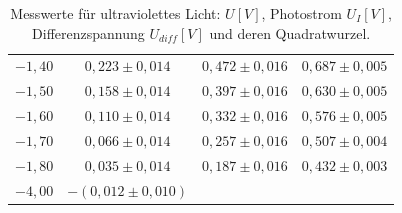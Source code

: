 \begin{table}[h!]
\begin{tabular}{c | ccc}
    $-1,40$ & $0,223 \pm 0,014$ & $0,472 \pm 0,016$ & $0,687 \pm 0,005$ \\
    $-1,50$ & $0,158 \pm 0,014$ & $0,397 \pm 0,016$ & $0,630 \pm 0,005$ \\
    $-1,60$ & $0,110 \pm 0,014$ & $0,332 \pm 0,016$ & $0,576 \pm 0,005$ \\
    $-1,70$ & $0,066 \pm 0,014$ & $0,257 \pm 0,016$ & $0,507 \pm 0,004$ \\
    $-1,80$ & $0,035 \pm 0,014$ & $0,187 \pm 0,016$ & $0,432 \pm 0,003$ \\
    $-4,00$ & $-(0,012 \pm 0,010)$ & & \\
    \hline
    \end{tabular}
    \caption{Messwerte für ultraviolettes Licht: $U [V]$, Photostrom $U_I [V]$, Differenzspannung $U_{diff} [V]$ und deren Quadratwurzel.}
    \label{tab:uv_values}
\end{table}


\newpage

